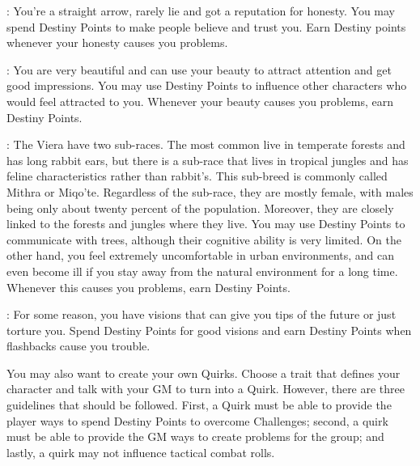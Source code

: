 \begin{multicols}{2}
\begin{ffcolpage}
: You're a straight arrow, rarely lie and got a reputation for honesty. You may spend Destiny Points to make people believe and trust you. Earn Destiny points whenever your honesty causes you problems.
\end{ffcolpage} \pw

\begin{ffcolpage}
: You are very beautiful and can use your beauty to attract attention and get good impressions. You may use Destiny Points to influence other characters who would feel attracted to you. Whenever your beauty causes you problems, earn Destiny Points.
\end{ffcolpage} \pw

\noindent{}
\begin{minipage}{.35\textwidth-2\columnsep}
: The Viera have two sub-races. The most common live in temperate forests and has long rabbit ears, but there is a sub-race that lives in tropical jungles and has feline characteristics rather than rabbit’s. This sub-breed is commonly called Mithra or Miqo'te. Regardless of the sub-race, they are mostly female, with males being only about twenty percent of the population. Moreover, they are closely linked to the forests and jungles where they live. You may use Destiny Points to communicate with trees, although their cognitive ability is very limited. On the other hand, you feel extremely uncomfortable in urban environments, and can even become ill if you stay away from the natural environment for a long time. Whenever this causes you problems, earn Destiny Points.
\end{minipage} \pw

\begin{ffcolpage}
: For some reason, you have visions that can give you tips of the future or just torture you. Spend Destiny Points for good visions and earn Destiny Points when flashbacks cause you trouble.
\end{ffcolpage} \pw

\begin{ffcolpage}
You may also want to create your own Quirks. Choose a trait that defines your character and talk with your GM to turn into a Quirk. However, there are three guidelines that should be followed. First, a Quirk must be able to provide the player ways to spend Destiny Points to overcome Challenges; second, a quirk must be able to provide the GM ways to create problems for the group; and lastly, a quirk may not influence tactical combat rolls.
\end{ffcolpage}
\end{multicols}


